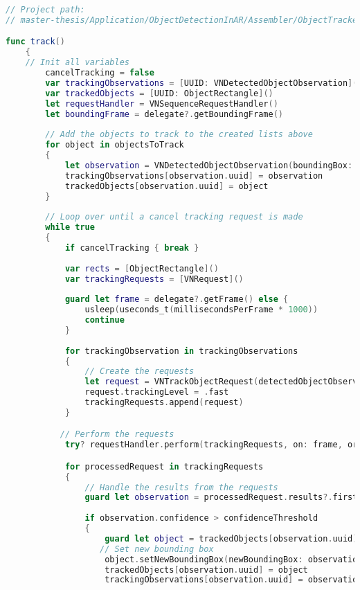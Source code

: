 \begin{lstlisting}[language=swift]
// Project path:
// master-thesis/Application/ObjectDetectionInAR/Assembler/ObjectTracker.swift

func track()
    {
    // Init all variables
        cancelTracking = false
        var trackingObservations = [UUID: VNDetectedObjectObservation]()
        var trackedObjects = [UUID: ObjectRectangle]()
        let requestHandler = VNSequenceRequestHandler()
        let boundingFrame = delegate?.getBoundingFrame()
        
        // Add the objects to track to the created lists above
        for object in objectsToTrack
        {
            let observation = VNDetectedObjectObservation(boundingBox: object.getNormalizedRect(frame: viewFrame))
            trackingObservations[observation.uuid] = observation
            trackedObjects[observation.uuid] = object
        }
        
        // Loop over until a cancel tracking request is made
        while true
        {
            if cancelTracking { break }
            
            var rects = [ObjectRectangle]()
            var trackingRequests = [VNRequest]()
            
            guard let frame = delegate?.getFrame() else {
                usleep(useconds_t(millisecondsPerFrame * 1000))
                continue
            }
            
            for trackingObservation in trackingObservations
            {
                // Create the requests
                let request = VNTrackObjectRequest(detectedObjectObservation: trackingObservation.value)
                request.trackingLevel = .fast
                trackingRequests.append(request)
            }

		   // Perform the requests
            try? requestHandler.perform(trackingRequests, on: frame, orientation: CGImagePropertyOrientation.up)

            for processedRequest in trackingRequests
            {
                // Handle the results from the requests
                guard let observation = processedRequest.results?.first as? VNDetectedObjectObservation else { continue }
                
                if observation.confidence > confidenceThreshold
                {
                    guard let object = trackedObjects[observation.uuid] else { continue }
                   // Set new bounding box
                    object.setNewBoundingBox(newBoundingBox: observation.boundingBox, frame: boundingFrame)
                    trackedObjects[observation.uuid] = object
                    trackingObservations[observation.uuid] = observation
                    

\end{lstlisting}
